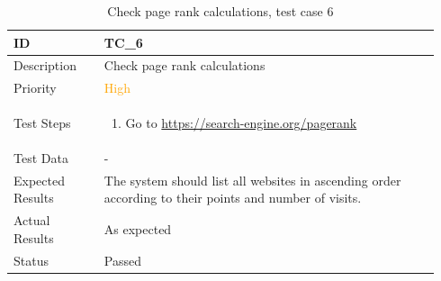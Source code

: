 \documentclass{scrartcl}
\begin{document}
\begin{table}[H]
  \caption{Check page rank calculations, test case 6}
  \begin{tabular}{p{0.2\linewidth} | p{0.74\linewidth}}
    \toprule
    ID & TC\_6
    \\\midrule
    Description & Check page rank calculations
    \\\hline
    Priority & \textcolor{orange}{High}
    \\\hline
    Test Steps & {
                 \begin{enumerate}
                 \item Go to \url{https://search-engine.org/pagerank}
                 \end{enumerate}
                 }\vspace*{-\baselineskip}
    \\\hline
    Test Data & -
    \\\hline
    Expected Results & The system should list all websites in ascending order according to their points and number of visits.
    \\\hline
    Actual Results & As expected
    \\\hline
    Status & Passed
    \\\bottomrule
  \end{tabular}
\end{table}



% 
% 



\end{document}
